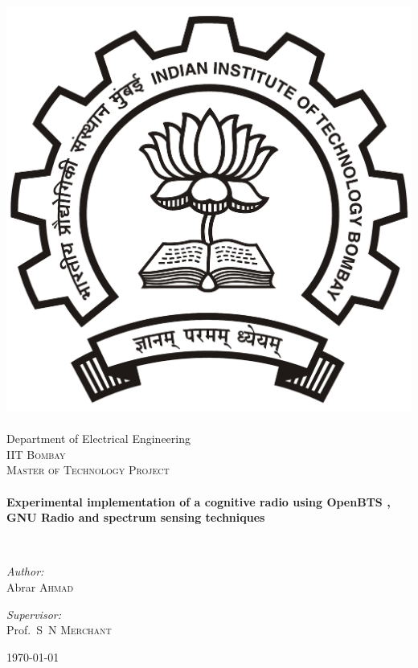 \begin{titlepage}
\begin{center}

\includegraphics[width=0.23\textheight]{iitbLogo}~\\[1cm]
Department of Electrical Engineering\\[0.3cm]
\textsc{\LARGE IIT Bombay}\\[1.5cm]

\textsc{\Large Master of Technology Project}\\[0.5cm]

\HRule \\[0.4cm]
{ \huge \bfseries Experimental implementation of a cognitive radio using OpenBTS , GNU Radio and spectrum sensing techniques\\[0.4cm] }

\HRule \\[1.5cm]

\begin{minipage}{0.4\textwidth}
\begin{flushleft} \large
\emph{Author:}\\
Abrar \textsc{Ahmad}\end{flushleft}
\end{minipage}
\begin{minipage}{0.4\textwidth}
\begin{flushright} \large
\emph{Supervisor:} \\
Prof.~S~N \textsc{Merchant}
\end{flushright}
\end{minipage}

\vfill

{\large \today}

\end{center}
\end{titlepage}
